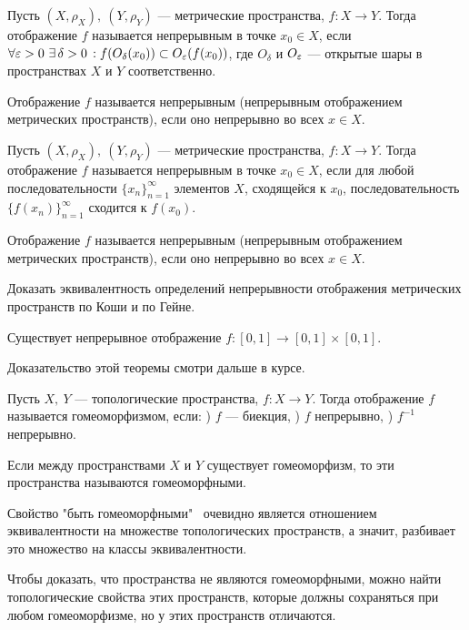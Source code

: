 \begin{definition}
    Пусть $(X, \rho_{X}), \ (Y, \rho_{Y})$ --- метрические пространства, $f: X \rightarrow Y$. Тогда отображение $f$ называется непрерывным в точке $x_0 \in X$,
    если $\forall \varepsilon > 0 \ \exists \, \delta > 0 \, : f(O_{\delta}(x_0)) \subset O_{\varepsilon}(f(x_0))$, где $O_{\delta}$ и $O_{\varepsilon}$ --- открытые шары в пространствах $X$ и $Y$ соответственно. 

    Отображение $f$ называется непрерывным (непрерывным отображением метрических пространств), если оно непрерывно во всех $x \in X$.
\end{definition}
\begin{definition}
    Пусть $(X, \rho_{X}), \ (Y, \rho_{Y})$ --- метрические пространства, $f: X \rightarrow Y$. Тогда отображение $f$ называется непрерывным в точке $x_0 \in X$,
    если для любой последовательности $\{x_n\}_{n = 1}^{\infty}$ элементов $X$, сходящейся к $x_0$, последовательность $\{f(x_n)\}_{n = 1}^{\infty}$ сходится к $f(x_0)$.

    Отображение $f$ называется непрерывным (непрерывным отображением метрических пространств), если оно непрерывно во всех $x \in X$.
\end{definition}

\begin{exercise}
    Доказать эквивалентность определений непрерывности отображения метрических пространств по Коши и по Гейне.
\end{exercise}

\begin{theorem}
    Существует непрерывное отображение $f: [0, 1] \rightarrow [0, 1] \times [0, 1]$.
\end{theorem}
Доказательство этой теоремы смотри дальше в курсе. %

\begin{definition}
    Пусть $X, \ Y$ --- топологические пространства, $f: X \rightarrow Y$. Тогда отображение $f$ называется гомеоморфизмом, если: ) $f$ --- биекция, ) $f$ непрерывно, ) $f^{-1}$ непрерывно.

    Если между пространствами $X$ и $Y$ существует гомеоморфизм, то эти пространства называются гомеоморфными.
\end{definition}

\begin{nota_bene}
    Свойство "быть гомеоморфными" \, очевидно является отношением эквивалентности на множестве топологических пространств, а значит, разбивает это множество на классы эквивалентности.

    Чтобы доказать, что пространства не являются гомеоморфными, можно найти топологические свойства этих пространств, которые должны сохраняться при любом гомеоморфизме, но у этих пространств отличаются. 
\end{nota_bene}

